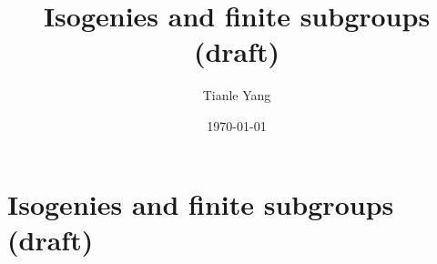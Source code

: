 \documentclass{noteformyself}
\title{Isogenies and finite subgroups (draft)}
\author{Tianle Yang}
\date{\today}
\begin{document}
    \maketitle

    \section{Isogenies and finite subgroups (draft)}


\end{document}
